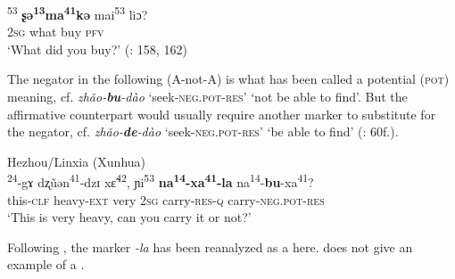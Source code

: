     \ex
    \textsuperscript{53} \textbf{{ʂə}}\textbf{\textsuperscript{13}}\textbf{{ma}}\textbf{\textsuperscript{41}}\textbf{{kə}}  {mai}\textsuperscript{53}  {liɔ}?\\
    2\textsc{sg}  what    buy  \textsc{pfv}\\
    \glt ‘What did you buy?’ (\citealt{Dwyer1995}: 158, 162)
    \z
    \z

The negator in the following  (A-not-A)  is what has been called a potential (\textsc{pot}) meaning, cf.  \textit{zhǎo-}\textbf{\textit{bu}}\textit{-dào} ‘seek-\textsc{neg}.\textsc{pot}-\textsc{res}’ ‘not be able to find’. But the affirmative counterpart would usually require another marker to substitute for the negator, cf.  \textit{zhǎo-}\textbf{\textit{de}}\textit{-dào} ‘seek-\textsc{neg}.\textsc{pot}-\textsc{res}’ ‘be able to find’ (\citealt{SunChaofen2006}: 60f.).

\ea%
    \label{ex:trans:25}
    Hezhou/Linxia (Xunhua)\\
    \textsuperscript{24}-gɤ  {{\textquotedbl}dʐ}{ũən}\textsuperscript{41}{-dzɪ}  {x\~{ɛ}}\textsuperscript{42}, {ɲi}\textsuperscript{53}  \textbf{{na}}\textbf{\textsuperscript{14}}\textbf{{-xa}}\textbf{\textsuperscript{41}}\textbf{{-la}} {na}\textsuperscript{14}{-}\textbf{{bu}}{-xa}\textsuperscript{41}?\\
    this\textsc{-clf}  heavy-\textsc{ext}  very 2\textsc{sg}  carry-\textsc{res}-\textsc{q}    carry-\textsc{neg.pot}-\textsc{res}\\
    \glt ‘This is very heavy, can you carry it or not?’ \citep[173]{Dwyer1995}
    \z

\noindent Following \citet{XieZhang1990}, the marker \textit{-la} has been reanalyzed as a  here. \citet{Dwyer1995} does not give an example of a .

